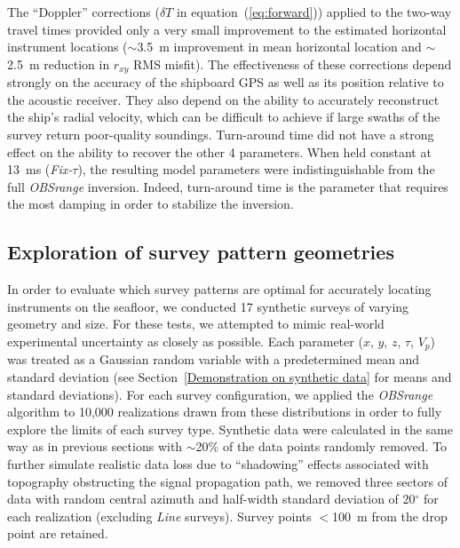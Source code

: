 The ``Doppler'' corrections ($\delta T$ in equation~(\ref{eq:forward})) applied to the two-way travel times provided only a very small improvement to the estimated horizontal instrument locations ($\sim$3.5~m improvement in mean horizontal location and $\sim$2.5~m reduction in $r_{xy}$ RMS misfit). The effectiveness of these corrections depend strongly on the accuracy of the shipboard GPS as well as its position relative to the acoustic receiver. They also depend on the ability to accurately reconstruct the ship's radial velocity, which can be difficult to achieve if large swaths of the survey return poor-quality soundings. Turn-around time did not have a strong effect on the ability to recover the other 4 parameters. When held constant at 13~ms (\textit{Fix-$\tau$}), the resulting model parameters were indistinguishable from the full \textit{OBSrange} inversion. Indeed, turn-around time is the parameter that requires the most damping in order to stabilize the inversion.


\subsection{Exploration of survey pattern geometries} \label{sec:surv_geom_tests}

In order to evaluate which survey patterns are optimal for accurately locating instruments on the seafloor, we conducted 17 synthetic surveys of varying geometry and size. For these tests, we attempted to mimic real-world experimental uncertainty as closely as possible. Each parameter ($x$, $y$, $z$, $\tau$, $V_p$) was treated as a Gaussian random variable with a predetermined mean and standard deviation (see Section~\ref{Demonstration on synthetic data} for means and standard deviations). For each survey configuration, we applied the \textit{OBSrange} algorithm to 10,000 realizations drawn from these distributions in order to fully explore the limits of each survey type. Synthetic data were calculated in the same way as in previous sections with $\sim$20\% of the data points randomly removed. To further simulate realistic data loss due to ``shadowing'' effects associated with topography obstructing the signal propagation path, we removed three sectors of data with random central azimuth and half-width standard deviation of 20$^{\circ}$ for each realization (excluding \textit{Line} surveys). Survey points $<$100~m from the drop point are retained.

